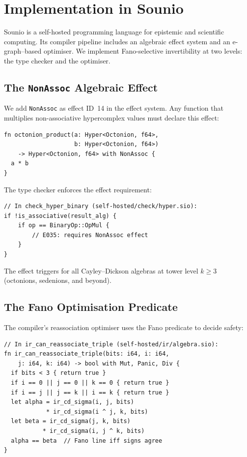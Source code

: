 \documentclass[11pt,a4paper]{article}
\theoremstyle{definition}
\theoremstyle{remark}
\begin{document}
\section{Implementation in Sounio}\label{sec:impl}

Sounio is a self-hosted programming language for epistemic and
scientific computing. Its compiler pipeline includes an algebraic
effect system and an e-graph--based optimiser. We implement
Fano-selective invertibility at two levels: the type checker and the
optimiser.

\subsection{The \texttt{NonAssoc} Algebraic Effect}

We add \texttt{NonAssoc} as effect ID~14 in the effect system. Any
function that multiplies non-associative hypercomplex values must
declare this effect:

\begin{lstlisting}[language=Sounio]
fn octonion_product(a: Hyper<Octonion, f64>,
                    b: Hyper<Octonion, f64>)
    -> Hyper<Octonion, f64> with NonAssoc {
  a * b
}
\end{lstlisting}

The type checker enforces the effect requirement:
\begin{lstlisting}[language=Sounio]
// In check_hyper_binary (self-hosted/check/hyper.sio):
if !is_associative(result_alg) {
    if op == BinaryOp::OpMul {
        // E035: requires NonAssoc effect
    }
}
\end{lstlisting}

The effect triggers for all Cayley--Dickson algebras at tower level
$k \geq 3$ (octonions, sedenions, and beyond).

\subsection{The Fano Optimisation Predicate}

The compiler's reassociation optimiser uses the Fano predicate to
decide safety:

\begin{lstlisting}[language=Sounio]
// In ir_can_reassociate_triple (self-hosted/ir/algebra.sio):
fn ir_can_reassociate_triple(bits: i64, i: i64,
    j: i64, k: i64) -> bool with Mut, Panic, Div {
  if bits < 3 { return true }
  if i == 0 || j == 0 || k == 0 { return true }
  if i == j || j == k || i == k { return true }
  let alpha = ir_cd_sigma(i, j, bits)
            * ir_cd_sigma(i ^ j, k, bits)
  let beta = ir_cd_sigma(j, k, bits)
           * ir_cd_sigma(i, j ^ k, bits)
  alpha == beta  // Fano line iff signs agree
}
\end{lstlisting}
\end{document}
